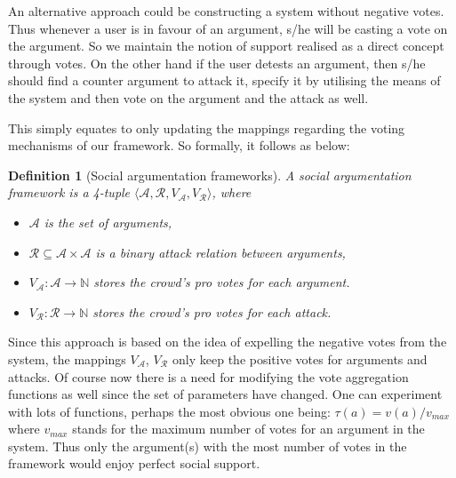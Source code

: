 \documentclass{article}
\newtheorem{definition}{Definition}
\newcommand{\nat}{\mathbb{N}}   %
\newcommand{\args}{\mathcal{A}} %
\newcommand{\att}{\mathcal{R}}  %
\newcommand{\varg}{V_{\args}}   %
\newcommand{\vatt}{V_{\att}}   %
\begin{document}
An alternative approach could be constructing a system without negative votes. Thus whenever a user is in favour of an argument, s/he will be casting a vote on the argument. So we maintain the notion of support realised as  a direct concept through votes. On the other hand if the user detests an argument, then s/he should find a counter argument to attack it, specify it by utilising the means of the system and then vote on the argument and the attack as well. {\color{red} This simply equates to only updating the mappings regarding the voting mechanisms of our framework. So formally, it follows as below:

\begin{definition}[Social argumentation frameworks]
A social argumentation framework is a 4-tuple $\langle \args, \att, \varg, \vatt \rangle$, where
\begin{itemize}
  \item $\mathcal{A}$ is the set of arguments,
  \item $\att \subseteq \args \times \args$ is a binary attack relation between arguments,
  \item $\varg : \args \to \nat$ stores the crowd's pro votes for each argument.
  \item $\vatt : \att \to \nat$ stores the crowd's pro votes for each attack.
\end{itemize}
\end{definition}

Since this approach is based on the idea of expelling the negative votes from the system, the mappings $\varg$, $\vatt$ only keep the positive votes for arguments and attacks. Of course now there is a need for modifying the vote aggregation functions as well since the set of parameters have changed. One can experiment with lots of functions, perhaps the most obvious one being: $\tau(a) = v(a) / v_{max}$ where  $v_{max}$ stands for the maximum number of votes for an argument in the system. Thus only the argument(s) with the most number of votes in the framework would enjoy perfect social support.


}


\end{document}
